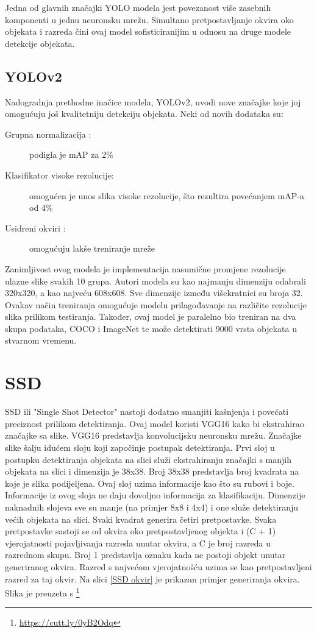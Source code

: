 Jedna od glavnih značajki YOLO modela jest povezanost više zasebnih komponenti u jednu neuronsku mrežu. 
Simultano pretpostavljanje okvira oko objekata i razreda čini ovaj model sofisticiranijim u odnosu na druge modele detekcije objekata. 


\subsection{YOLOv2}
Nadogradnja prethodne inačice modela, YOLOv2, uvodi nove značajke koje joj omogućuju još kvalitetniju detekciju objekata.\newline
Neki od novih dodataka su:
\begin{description}
    \item [Grupna normalizacija :]podigla je mAP za 2\%
    \item [Klasifikator visoke rezolucije:]omogućen je unos slika visoke rezolucije, što rezultira povećanjem mAP-a od 4\%
    \item [Usidreni okviri :]omogućuju lakše treniranje mreže
\end{description}

Zanimljivost ovog modela je implementacija nasumične promjene rezolucije ulazne slike svakih 10 grupa.
Autori modela su kao najmanju dimenziju odabrali 320x320, a 
kao najveću 608x608. Sve dimenzije između višekratnici su broja 32. \newline
Ovakav način treniranja omogućuje modelu prilagođavanje na različite rezolucije 
slika prilikom testiranja. \newline
Također, ovaj model je paralelno bio treniran na dva skupa podataka, COCO i ImageNet te može 
detektirati 9000 vrsta objekata u stvarnom vremenu. \citep{DBLP:journals/corr/RedmonF16}


\section{SSD}
SSD ili "Single Shot Detector" nastoji dodatno smanjiti kašnjenja i povećati preciznost prilikom detektiranja. 
Ovaj model koristi VGG16 kako bi ekstrahirao značajke sa slike. VGG16 predstavlja konvolucijsku neuronsku mrežu. 
Značajke slike šalju idućem sloju koji započinje postupak detektiranja. Prvi sloj u postupku detektiranja objekata
na slici služi ekstrahiranju značajki s manjih objekata na slici i dimenzija je 38x38. Broj 38x38 predstavlja broj kvadrata na koje je slika 
podijeljena. Ovaj sloj uzima informacije kao što su rubovi i boje. Informacije iz ovog sloja ne daju dovoljno informacija za klasifikaciju. Dimenzije naknadnih slojeva 
sve su manje (na primjer 8x8 i 4x4) i one služe detektiranju većih objekata na slici. 
Svaki kvadrat generira četiri pretpostavke. Svaka pretpostavke sastoji se od okvira oko pretpostavljenog objekta 
i (C + 1)  vjerojatnosti pojavljivanja razreda unutar okvira, a C je broj razreda u razrednom skupu. Broj 1 predstavlja oznaku
kada ne postoji objekt unutar generiranog okvira. Razred s najvećom vjerojatnošću uzima se kao pretpostavljeni razred 
za taj okvir. Na slici \ref{SSD okvir} je prikazan primjer generiranja okvira. Slika je preuzeta s \footnote{\url{https://cutt.ly/0yB2Odq}}


